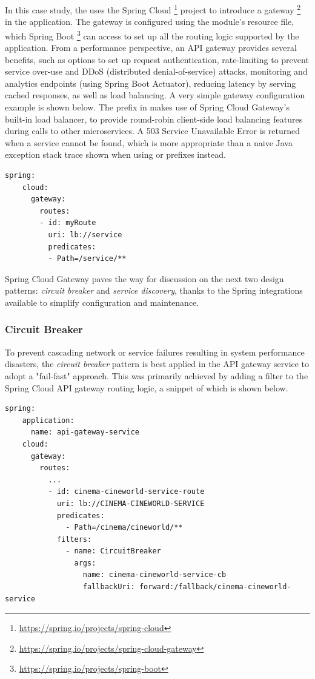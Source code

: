 In this case study, the  uses the Spring Cloud \footnote{\url{https://spring.io/projects/spring-cloud}} project to introduce a gateway \footnote{\url{https://spring.io/projects/spring-cloud-gateway}} in the application. The gateway is configured using the module's  resource file, which Spring Boot \footnote{\url{https://spring.io/projects/spring-boot}} can access to set up all the routing logic supported by the application. From a performance perspective, an API gateway provides several benefits, such as options to set up request authentication, rate-limiting to prevent service over-use and DDoS (distributed denial-of-service) attacks, monitoring and analytics endpoints (using Spring Boot Actuator), reducing latency by serving cached responses, as well as load balancing. A very simple gateway configuration example is shown below. The  prefix in  makes use of Spring Cloud Gateway's built-in load balancer, to provide round-robin client-side load balancing features during calls to other microservices. A 503 Service Unavailable Error is returned when a service cannot be found, which is more appropriate than a naive Java exception stack trace shown when using  or  prefixes instead.

\begin{lstlisting}[caption=Sample Spring Cloud Gateway configuration.]
  spring:
    cloud:
      gateway:
        routes:
        - id: myRoute
          uri: lb://service
          predicates:
          - Path=/service/**
\end{lstlisting}

Spring Cloud Gateway paves the way for discussion on the next two design patterns: \textit{circuit breaker} and \textit{service discovery}, thanks to the Spring integrations available to simplify configuration and maintenance.

\subsubsection{Circuit Breaker}

To prevent cascading network or service failures resulting in system performance disasters, the \textit{circuit breaker} pattern is best applied in the API gateway service to adopt a "fail-fast" approach. This was primarily achieved by adding a  filter to the Spring Cloud API gateway routing logic, a snippet of which is shown below.

\begin{lstlisting}[caption=Snippet from the API gateway service's application properties.]
  spring:
    application:
      name: api-gateway-service
    cloud:
      gateway:
        routes:
          ...
          - id: cinema-cineworld-service-route
            uri: lb://CINEMA-CINEWORLD-SERVICE
            predicates:
              - Path=/cinema/cineworld/**
            filters:
              - name: CircuitBreaker
                args:
                  name: cinema-cineworld-service-cb
                  fallbackUri: forward:/fallback/cinema-cineworld-service
\end{lstlisting}

